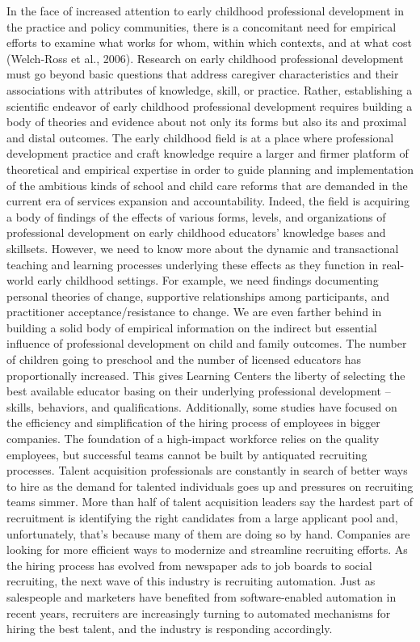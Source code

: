 In the face of increased attention to early childhood professional development in the practice and policy communities, there is a concomitant need for empirical efforts to examine what works for whom, within which contexts, and at what cost (Welch-Ross et al., 2006). Research on early childhood professional development must go beyond basic questions that address caregiver characteristics and their associations with attributes of knowledge, skill, or practice. Rather, establishing a scientific endeavor of early childhood professional development requires building a body of theories and evidence about not only its forms but also its and proximal and distal outcomes. The early childhood field is at a place where professional development practice and craft knowledge require a larger and firmer platform of theoretical and empirical expertise in order to guide planning and implementation of the ambitious kinds of school and child care reforms that are demanded in the current era of services expansion and accountability. Indeed, the field is acquiring a body of findings of the effects of various forms, levels, and organizations of professional development on early childhood educators' knowledge bases and skillsets. However, we need to know more about the dynamic and transactional teaching and learning processes underlying these effects as they function in real-world early childhood settings. For example, we need findings documenting personal theories of change, supportive relationships among participants, and practitioner acceptance/resistance to change. We are even farther behind in building a solid body of empirical information on the indirect but essential influence of professional development on child and family outcomes. The number of children going to preschool and the number of licensed educators has proportionally increased. This gives Learning Centers the liberty of selecting the best available educator basing on their underlying professional development – skills, behaviors, and qualifications. 
Additionally, some studies have focused on the efficiency and simplification of the hiring process of employees in bigger companies. The foundation of a high-impact workforce relies on the quality employees, but successful teams cannot be built by antiquated recruiting processes. Talent acquisition professionals are constantly in search of better ways to hire as the demand for talented individuals goes up and pressures on recruiting teams simmer. More than half of talent acquisition leaders say the hardest part of recruitment is identifying the right candidates from a large applicant pool and, unfortunately, that's because many of them are doing so by hand. Companies are looking for more efficient ways to modernize and streamline recruiting efforts. As the hiring process has evolved from newspaper ads to job boards to social recruiting, the next wave of this industry is recruiting automation. Just as salespeople and marketers have benefited from software-enabled automation in recent years, recruiters are increasingly turning to automated mechanisms for hiring the best talent, and the industry is responding accordingly.
